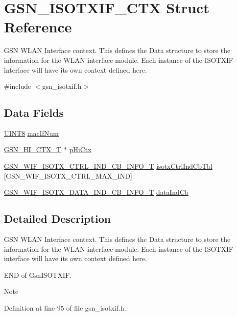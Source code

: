 \hypertarget{a00105}{
\section{GSN\_\-ISOTXIF\_\-CTX Struct Reference}
\label{a00105}
}


GSN WLAN Interface context. This defines the Data structure to store the information for the WLAN interface module. Each instance of the ISOTXIF interface will have its own context defined here.  




{\ttfamily \#include $<$gsn\_\-isotxif.h$>$}

\subsection*{Data Fields}
\begin{DoxyCompactItemize}
\item 
\hyperlink{a00660_gab27e9918b538ce9d8ca692479b375b6a}{UINT8} \hyperlink{a00105_ae57ae92e651751e7978e237c55133b4c}{macIfNum}
\item 
\hyperlink{a00085}{GSN\_\-HI\_\-CTX\_\-T} $\ast$ \hyperlink{a00105_ab671e23204d79f8fda7dba9992c3d6e9}{pHiCtx}
\item 
\hyperlink{a00339}{GSN\_\-WIF\_\-ISOTX\_\-CTRL\_\-IND\_\-CB\_\-INFO\_\-T} \hyperlink{a00105_a64be33f39615940ee3459e0af01a01dc}{isotxCtrlIndCbTbl} \mbox{[}GSN\_\-WIF\_\-ISOTX\_\-CTRL\_\-MAX\_\-IND\mbox{]}
\item 
\hyperlink{a00340}{GSN\_\-WIF\_\-ISOTX\_\-DATA\_\-IND\_\-CB\_\-INFO\_\-T} \hyperlink{a00105_a30f0e7ec261354cbdfd47048527b3373}{dataIndCb}
\end{DoxyCompactItemize}


\subsection{Detailed Description}
GSN WLAN Interface context. This defines the Data structure to store the information for the WLAN interface module. Each instance of the ISOTXIF interface will have its own context defined here. 

END of GsnISOTXIF.

\begin{DoxyNote}{Note}

\end{DoxyNote}


Definition at line 95 of file gsn\_\-isotxif.h.



